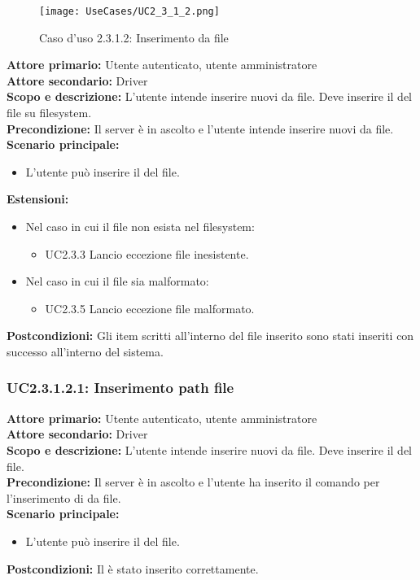 \documentclass{scalatekids-article}
\begin{document}
\begin{figure}[H]
  \begin{center}
    \texttt{[image: UseCases/UC2\_3\_1\_2.png]}
    \caption*{Caso d'uso 2.3.1.2: Inserimento  da file}
  \end{center}
\end{figure}
\textbf{Attore primario:} Utente autenticato, utente amministratore\\
\textbf{Attore secondario:} Driver\\
\textbf{Scopo e descrizione:} L'utente intende inserire nuovi  da file. Deve inserire il  del file su filesystem.\\
\textbf{Precondizione:} Il server è in ascolto e l'utente intende inserire nuovi  da file.\\
\textbf{Scenario principale:}
\begin{itemize}
\item L'utente può inserire il  del file.
\end{itemize}
\textbf{Estensioni:}
\begin{itemize}
\item Nel caso in cui il file non esista nel filesystem: %
  \begin{itemize}
  \item UC2.3.3 Lancio eccezione file inesistente.
  \end{itemize}
\item Nel caso in cui il file sia malformato:
\begin{itemize}
	\item UC2.3.5 Lancio eccezione file malformato.
	\end{itemize}
\end{itemize}
\textbf{Postcondizioni:} Gli item scritti all'interno del file inserito sono stati inseriti con successo all'interno del sistema.%

\subsubsection{UC2.3.1.2.1: Inserimento path file} %

\textbf{Attore primario:} Utente autenticato, utente amministratore\\
\textbf{Attore secondario:} Driver\\
\textbf{Scopo e descrizione:} L'utente intende inserire nuovi  da file. Deve inserire il  del file.\\
\textbf{Precondizione:} Il server è in ascolto e l'utente ha inserito il comando per l'inserimento di  da file.\\
\textbf{Scenario principale:}
\begin{itemize}
\item L'utente può inserire il  del file.
\end{itemize}
\textbf{Postcondizioni:} Il  è stato inserito correttamente.
\end{document}
